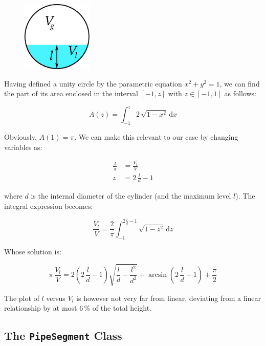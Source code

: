 \documentclass[a4paper]{article}
\renewcommand{\d}{\ensuremath{\mathrm{d}}}
\begin{document}
\begin{figure}[h]
\centering
\includegraphics[width=0.3\textwidth]{pics/crosssection}
\end{figure}

Having defined a unity circle by the parametric equation $x^2+y^2=1$, we can
find the part of its area enclosed in the interval $[-1,z]$ with $z \in [-1,1]$
as follows:

\begin{equation}
A(z) = \int_{-1}^z 2 \, \sqrt{1-x^2} \, \d x
\end{equation}

Obviously, $A(1) = \pi$. We can make this relevant to our case by changing
variables as:

\begin{align}
\frac{A}{\pi} &= \frac{V_l}{V}\\
z &= 2\,\frac{l}{d}-1
\end{align}

where $d$ is the internal diameter of the cylinder (and the maximum level $l$).
The integral expression becomes:

\begin{equation}
\frac{V_l}{V} = \frac{2}{\pi} \int_{-1}^{2\frac{l}{d}-1} \sqrt{1-z^2} \, \d z
\end{equation}

Whose solution is:

\begin{equation}
\pi \, \frac{V_l}{V} = 2 \left(2\,\frac{l}{d} -1 \right)\sqrt{\frac{l}{d}-
\frac{l^2}{d^2}} + \arcsin\left(2\,\frac{l}{d} -1 \right) + \frac{\pi}{2}
\end{equation}

The plot of $l$ versus $V_l$ is however not very far from linear, deviating from
a linear relationship by at most 6\,\% of the total height.

\subsection{The \texttt{PipeSegment} Class}
\end{document}
